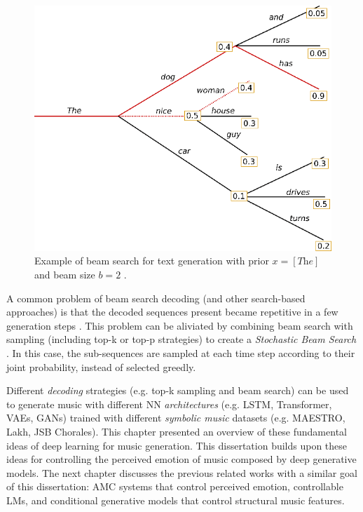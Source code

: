 \begin{figure}[!h]
 \centering
 \includegraphics[width=0.7\columnwidth]{imgs/background/beam.png}
 \caption{Example of beam search for text generation with prior $x = [\textit{The}]$ and
 beam size $b=2$ \cite{platen2020}.}
 \label{fig:beam}
\end{figure}

A common problem of beam search decoding (and other search-based approaches) is that the decoded sequences present became repetitive in a few generation steps \cite{holtzman2019curious}. This problem can be aliviated by combining beam search with sampling (including top-k or top-p strategies) to create a \textit{Stochastic Beam Search} \cite{poole2010artificial}. In this case, the sub-sequences are sampled at each time step according to their joint probability, instead of selected greedly.

Different \textit{decoding} strategies (e.g. top-k sampling and beam search) can be used to generate music with different NN \textit{architectures} (e.g. LSTM, Transformer, VAEs, GANs) trained with different \textit{symbolic music} datasets (e.g. MAESTRO, Lakh, JSB Chorales). This chapter presented an overview
of these fundamental ideas of deep learning for music generation. This dissertation builds upon these ideas for controlling the perceived emotion of music composed by deep generative models. The next chapter discusses the previous related works with a similar goal of this dissertation: AMC systems that control perceived emotion, controllable LMs, and conditional generative models that control structural music features.
